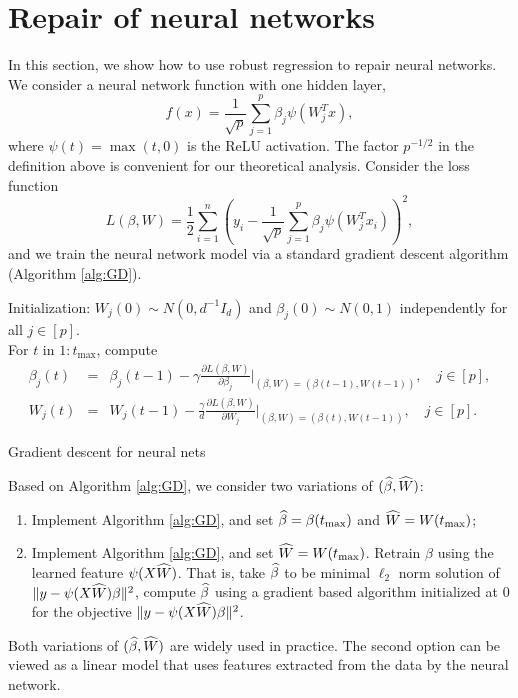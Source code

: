 


\section{Repair of neural networks}
\label{sec:neural}

In this section, we show how to use robust regression to repair neural networks.
We consider a neural network function with one hidden layer,
$$f(x)=\frac{1}{\sqrt{p}}\sum_{j=1}^p\beta_j\psi(W_j^Tx),$$
where $\psi(t)=\max(t,0)$ is the ReLU activation.
The factor $p^{-1/2}$ in the definition above is convenient for our theoretical analysis.
Consider the loss function
$$L(\beta,W)=\frac{1}{2}\sum_{i=1}^n\left(y_i - \frac{1}{\sqrt{p}}\sum_{j=1}^p\beta_j\psi(W_j^Tx_i)\right)^2,$$
and we train the neural network model via a standard gradient descent algorithm (Algorithm \ref{alg:GD}).
\begin{algorithm}[H]
\DontPrintSemicolon
{}
\nl Initialization: $W_j(0)\sim N(0,d^{-1}I_d)$ and $\beta_j(0)\sim N(0,1)$ independently for all $j\in[p]$. \\
\nl For $t$ in $1:t_{\max}$, compute 
\begin{eqnarray*}
\beta_j(t) &=& \beta_j(t-1) - \gamma\frac{\partial L(\beta,W)}{\partial \beta_j}|_{(\beta,W)=(\beta(t-1),W(t-1))}, \quad j\in[p], \\
W_j(t) &=& W_j(t-1) - \frac{\gamma}{d}\frac{\partial L(\beta,W)}{\partial W_j}|_{(\beta,W)=(\beta(t),W(t-1))}, \quad j\in[p].
\end{eqnarray*}
 \caption{Gradient descent for neural nets}\label{alg:GD}
\end{algorithm}
Based on Algorithm \ref{alg:GD}, we consider two variations of $(\widehat{\beta},\widehat{W})$:
\begin{enumerate}
\item Implement Algorithm \ref{alg:GD}, and set $\widehat{\beta}=\beta(t_{\max})$ and $\widehat{W}=W(t_{\max})$;
\item Implement Algorithm \ref{alg:GD}, and set $\widehat{W}=W(t_{\max})$. Retrain $\beta$ using the learned feature $\psi(X\widehat{W})$. That is, take $\widehat{\beta}$ to be minimal $\ell_2$ norm solution of $\|y-\psi(X\widehat{W})\beta\|^2$, compute $\widehat{\beta}$ using a gradient based algorithm initialized at $0$ for the objective $\|y-\psi(X\widehat{W})\beta\|^2$.
\end{enumerate}
Both variations of $(\widehat{\beta},\widehat{W})$ are widely used in practice. The second option can be viewed as a linear model that uses features extracted from the data by the neural network.

